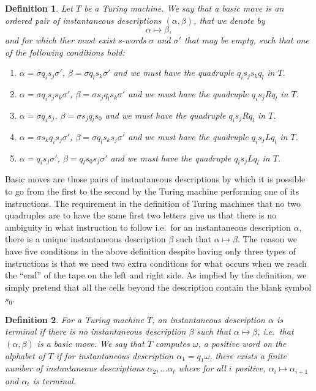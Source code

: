 \documentclass[12pt]{article}
\newtheorem{definition}{Definition}
\theoremstyle{definition}
\numberwithin{equation}{theorem}
\begin{document}
\begin{definition}
  Let $T$ be a Turing machine. We say that a \emph{basic move} is an ordered pair of instantaneous descriptions $(\alpha,\beta)$, that we denote by
  \begin{equation*}
    \alpha \mapsto \beta,
  \end{equation*}
  and for which ther must exist s-words $\sigma$ and $\sigma'$ that may be empty, such that one of the following conditions hold:
  \begin{enumerate}
  \item $\alpha = \sigma q_i s_j\sigma'$, $\beta = \sigma q_l s_k \sigma'$ and we must have the quadruple $q_is_js_kq_l$ in $T$.
  \item $\alpha = \sigma q_i s_j s_k \sigma'$, $\beta = \sigma s_j q_l s_k \sigma'$ and we must have the quadruple $q_is_jRq_l$ in $T$.
  \item $\alpha = \sigma q_i s_j$, $\beta = \sigma s_j q_l s_0$ and we must have the quadruple $q_is_jRq_l$ in $T$.
  \item $\alpha = \sigma s_k q_i s_j \sigma'$, $\beta = \sigma q_l s_k s_j \sigma'$ and we must have the quadruple $q_is_jLq_l$ in $T$.
  \item $\alpha = q_i s_j \sigma'$, $\beta =  q_l s_0 s_j \sigma'$ and we must have the quadruple $q_is_jLq_l$ in $T$.
  \end{enumerate}
\end{definition}

Basic moves are those pairs of instantaneous descriptions by which it is possible to go from the first to the second by the Turing machine performing one of its instructions. The requirement in the definition of Turing machines that no two quadruples are to have the same first two letters give us that there is no ambiguity in what instruction to follow i.e.\ for an instantaneous description $\alpha$, there is a unique instantaneous description $\beta$ such that $\alpha \mapsto \beta$. The reason we have five conditions in the above definition despite having only three types of instructions is that we need two extra conditions for what occurs when we reach the ``end'' of the tape on the left and right side. As implied by the definition, we simply pretend that all the cells beyond the description contain the blank symbol $s_0$.

\begin{definition}
For a Turing machine $T$, an instantaneous description $\alpha$ is \emph{terminal} if there is no instantaneous description $\beta$ such that $\alpha \mapsto \beta$, i.e.\ that $(\alpha,\beta)$ is a basic move. We say that $T$ \emph{computes} $\omega$, a positive word on the alphabet of $T$ if for instantaneous description $\alpha_1 = q_1\omega$, there exists a finite number of instantaneous descriptions $\alpha_2,\dots \alpha_t$ where for all $i$ positive, $\alpha_i \mapsto \alpha_{i+1}$ and $\alpha_t$ is terminal.
\end{definition}
\end{document}
